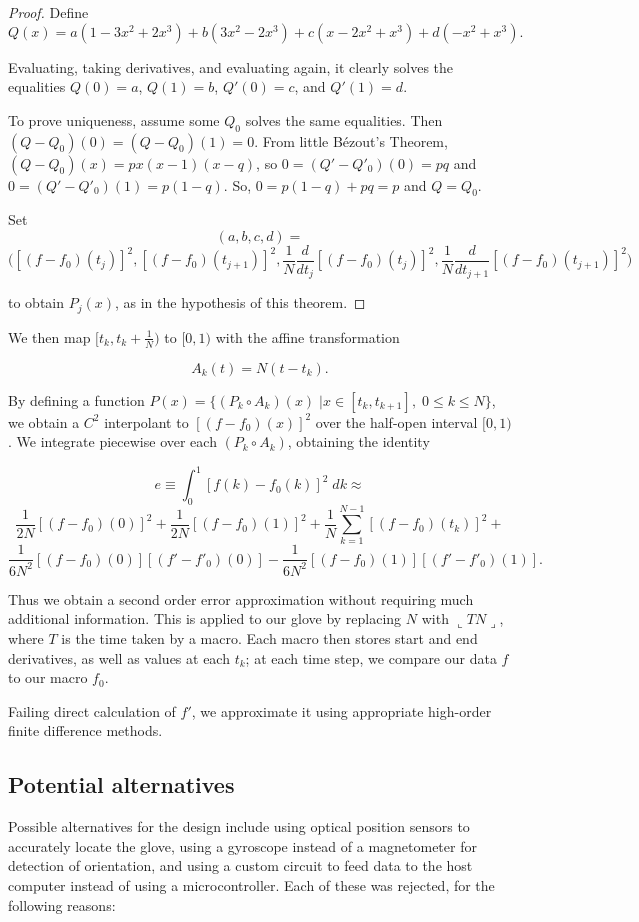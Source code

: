 \documentclass{article}
\begin{document}
	\begin{proof}
		Define 
		$$Q(x)=a(1-3x^2+2x^3)+b(3x^2-2x^3)+c(x-2x^2+x^3)+d(-x^2+x^3).$$
		
		Evaluating, taking derivatives, and evaluating again, it clearly solves the equalities $Q(0)=a$, $Q(1)=b$, $Q'(0)=c$, and $Q'(1)=d$. 
		
		To prove uniqueness, assume some $Q_0$ solves the same equalities. Then $(Q-Q_0)(0)=(Q-Q_0)(1)=0$. From little B\'{e}zout's Theorem, $(Q-Q_0)(x)=px(x-1)(x-q)$, so $0=(Q'-Q'_0)(0)=pq$ and $0=(Q'-Q'_0)(1)=p(1-q)$. So, $0=p(1-q)+pq=p$ and $Q=Q_0$.
		
		Set $$(a,b,c,d)=$$
		$$\big([(f-f_0)(t_j)]^2,[(f-f_0)(t_{j+1})]^2,\frac{1}{N}\frac{d}{dt_j}[(f-f_0)(t_j)]^2,\frac{1}{N}\frac{d}{dt_{j+1}}[(f-f_0)(t_{j+1})]^2\big)$$
		
		to obtain $P_j(x)$, as in the hypothesis of this theorem.
	\end{proof}

	We then map $[t_k,t_k +\frac{1}{N})$ to $[0,1)$ with the affine transformation 
	
	$$A_k(t)=N(t-t_k).$$
	
	By defining a function $P(x)=\{(P_k\circ A_k)(x) \; | x \in [t_k,t_{k+1}], \;0\leq k \leq N \}$, we obtain a $C^2$ interpolant to $[(f-f_0)(x)]^2$ over the half-open interval $[0,1)$. We integrate piecewise over each $(P_k\circ A_k)$, obtaining the identity

	$$ e \equiv \int_0^1 [f(k)-f_0(k)]^2\;dk \approx$$
	$$\frac{1}{2N}[(f-f_0)(0)]^2+\frac{1}{2N}[(f-f_0)(1)]^2+\frac{1}{N}\sum\limits_{k=1}^{N-1} [(f-f_0)(t_k)]^2 + $$
	$$ \frac{1}{6N^2}[(f-f_0)(0)][(f'-f'_0)(0)] - \frac{1}{6N^2}[(f-f_0)(1)][(f'-f'_0)(1)] .$$
	
	Thus we obtain a second order error approximation without requiring much additional information. This is applied to our glove by replacing $N$ with $\llcorner TN \lrcorner$, where $T$ is the time taken by a macro. Each macro then stores start and end derivatives, as well as values at each $t_k$; at each time step, we compare our data $f$ to our macro $f_0$.
	
	Failing direct calculation of $f'$, we approximate it using appropriate high-order finite difference methods.
	
	\subsection*{Potential alternatives}
	
	Possible alternatives for the design include using optical position sensors to accurately locate the glove, using a gyroscope instead of a magnetometer for detection of orientation, and using a custom circuit to feed data to the host computer instead of using a microcontroller. Each of these was rejected, for the following reasons:
	
\end{document}
